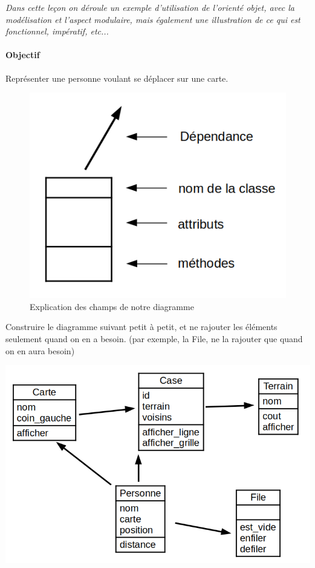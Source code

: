 
\textit{Dans cette leçon on déroule un exemple d'utilisation de l'orienté objet, avec la modélisation et l'aspect modulaire, mais également une illustration de ce qui est fonctionnel, impératif, etc...}

\paragraph{Objectif} Représenter une personne voulant se déplacer sur une carte.

\begin{figure}
    \centering
    \includegraphics[scale=0.5]{Developpements/Illustration oriente objet/explication uml.png}
    \caption{Explication des champs de notre diagramme}
\end{figure}

\begin{com}
    Construire le diagramme suivant petit à petit, et ne rajouter les éléments seulement quand on en a besoin. (par exemple, la File, ne la rajouter que quand on en aura besoin)
\end{com}

\includegraphics[scale=0.5]{Developpements/Illustration oriente objet/diagramme uml.png}


